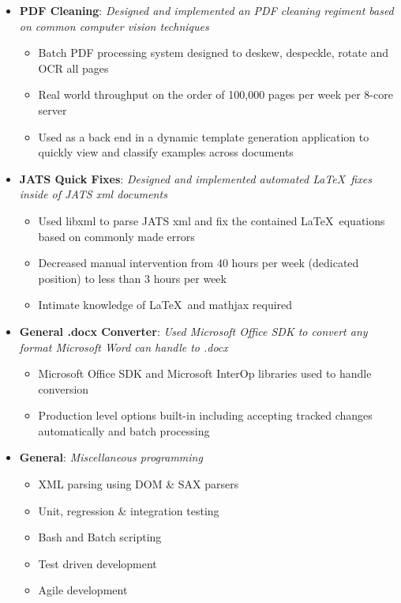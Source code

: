 \documentclass{article}
\newcommand{\ListItem}[2]{
	\item \small \textbf{#1}{: \it #2}
}
\begin{document}
\begin{itemize}[label=\faUsers]
\begin{itemize}[label=\faGears]
		\ListItem{PDF Cleaning}{Designed and implemented an PDF cleaning regiment based on common computer vision techniques}
		\begin{itemize}[label=\faGear]
			\item Batch PDF processing system designed to deskew, despeckle, rotate and OCR all pages
			\item Real world throughput on the order of 100,000 pages per week per 8-core server
			\item Used as a back end in a dynamic template generation application to quickly view and classify examples across documents
		\end{itemize}

		\ListItem{JATS Quick Fixes}{Designed and implemented automated \LaTeX\ fixes inside of JATS xml documents}
		\begin{itemize}[label=\faGear]
			\item Used libxml to parse JATS xml and fix the contained \LaTeX\ equations based on commonly made errors
			\item Decreased manual intervention from 40 hours per week (dedicated position) to less than 3 hours per week
			\item Intimate knowledge of \LaTeX\ and mathjax required
		\end{itemize}

		\ListItem{General .docx Converter}{Used Microsoft Office SDK to convert any format Microsoft Word can handle to .docx}
		\begin{itemize}[label=\faGear]
			\item Microsoft Office SDK and Microsoft InterOp libraries used to handle conversion
			\item Production level options built-in including accepting tracked changes automatically and batch processing
		\end{itemize}

		\ListItem{General}{Miscellaneous programming}
		\begin{itemize}[label=\faGear]
			\item XML parsing using DOM \& SAX parsers
			\item Unit, regression \& integration testing
            \item Bash and Batch scripting
			\item Test driven development
			\item Agile development
		\end{itemize}

	\end{itemize}
	
	
	\vspace{1em}
	
\end{itemize}
\end{document}

